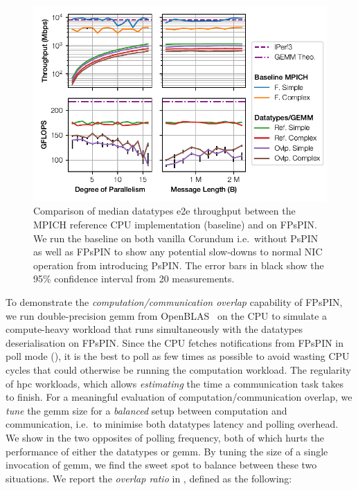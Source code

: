 \begin{figure}[tp]
    \centering
    \includegraphics{thesis/figures/datatypes-tput.pdf}
    \caption{Comparison of median datatypes \ac{e2e} throughput between the MPICH reference CPU implementation (baseline) and on FPsPIN.  We run the baseline on both vanilla Corundum i.e.\ without PsPIN as well as FPsPIN to show any potential slow-downs to normal NIC operation from introducing PsPIN.  The error bars in black show the 95\% confidence interval from 20 measurements.} \label{fig:datatypes-tput}
\end{figure}

To demonstrate the \emph{computation/communication overlap} capability of FPsPIN, we run double-precision \ac{gemm} from OpenBLAS~\cite{xianyi_model-driven_2012} on the CPU to simulate a compute-heavy workload that runs simultaneously with the datatypes deserialisation on FPsPIN.  Since the CPU fetches notifications from FPsPIN in poll mode (), it is the best to poll as few times as possible to avoid wasting CPU cycles that could otherwise be running the computation workload.  The regularity of \ac{hpc} workloads, which allows \emph{estimating} the time a communication task takes to finish.  For a meaningful evaluation of computation/communication overlap, we \emph{tune} the \ac{gemm} size for a \emph{balanced} setup between computation and communication, i.e.\ to minimise both datatypes latency and polling overhead.  We show in  the two opposites of polling frequency, both of which hurts the performance of either the datatypes or \ac{gemm}.  By tuning the size of a single invocation of \ac{gemm}, we find the sweet spot to balance between these two situations.  We report the \emph{overlap ratio} in , defined as the following:

